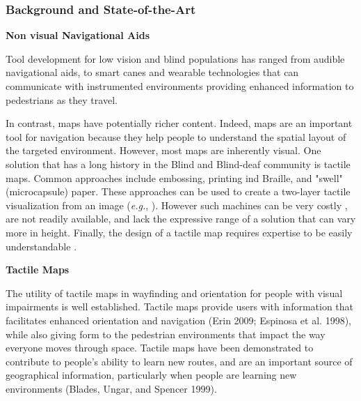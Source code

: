 
\subsubsection{Background and State-of-the-Art}

\textbf{Non visual Navigational Aids}

Tool development for low vision and blind populations has ranged from audible navigational aids, to smart canes and wearable technologies that can communicate with instrumented environments providing enhanced information to pedestrians as they travel. 

In contrast, maps have potentially richer content. Indeed, maps are an important tool for  navigation because they help people to understand the spatial layout of the targeted environment. However, most maps are inherently visual. One solution that has a long history in the Blind and Blind-deaf community is tactile maps. Common approaches include embossing, printing ind Braille, and "swell" (microcapsule) paper. These approaches can be used to create a two-layer tactile visualization from an image (\textit{e.g.}, \cite{miele2006talking}). However such machines can be very costly \cite{rice2005design}, are not readily available, and lack the expressive range of a solution that can vary more in height. Finally, the design of a tactile map requires expertise to be easily understandable \cite{tatham1991design}.


\textbf{Tactile Maps}

The utility of tactile maps in wayfinding and orientation for people with visual impairments is well established. Tactile maps provide users with information that facilitates enhanced orientation and navigation (Erin 2009; Espinosa et al. 1998), while also giving form to the pedestrian environments that impact the way everyone moves through space. 
Tactile maps have been demonstrated to contribute to people’s ability to learn new routes, and are an important source of geographical information, particularly when people are learning new environments (Blades, Ungar, and Spencer 1999). 

